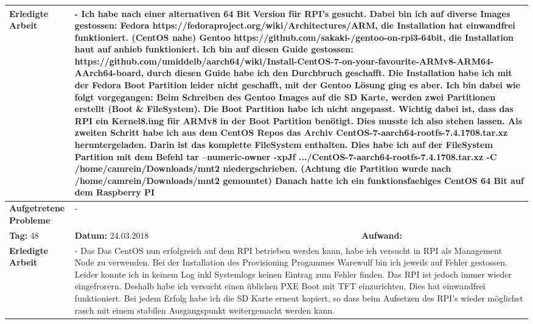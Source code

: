 \begin{longtable}{|p{5cm}|p{5cm}|p{6cm}|}
\textbf{Erledigte Arbeit} & \multicolumn{2}{p{11cm}|}{- Ich habe nach einer alternativen 64 Bit Version für RPI's gesucht. Dabei bin ich auf diverse Images gestossen: \newline Fedora https://fedoraproject.org/wiki/Architectures/ARM, die Installation hat einwandfrei funktioniert. (CentOS nahe) \newline Gentoo https://github.com/sakaki-/gentoo-on-rpi3-64bit, die Installation haut auf anhieb funktioniert. Ich bin auf diesen Guide gestossen: https://github.com/umiddelb/aarch64/wiki/Install-CentOS-7-on-your-favourite-ARMv8-ARM64-AArch64-board, durch diesen Guide habe ich den Durchbruch geschafft. Die Installation habe ich mit der Fedora Boot Partition leider nicht geschafft, mit der Gentoo Lösung ging es aber. Ich bin dabei wie folgt vorgegangen: Beim Schreiben des Gentoo Images auf die SD Karte, werden zwei Partitionen erstellt (Boot \& FileSystem). Die Boot Partition habe ich nicht angepasst. Wichtig dabei ist, dass das RPI ein Kernel8.img für ARMv8 in der Boot Partition benötigt. Dies musste ich also stehen lassen. Als zweiten Schritt habe ich aus dem CentOS Repos das Archiv CentOS-7-aarch64-rootfs-7.4.1708.tar.xz heruntergeladen. Darin ist das komplette FileSystem enthalten. Dies habe ich auf der FileSystem Partition mit dem Befehl tar --numeric-owner -xpJf .../CentOS-7-aarch64-rootfs-7.4.1708.tar.xz -C /home/camrein/Downloads/mnt2 niedergschrieben. (Achtung die Partition wurde nach /home/camrein/Downloads/mnt2 gemountet) Danach hatte ich ein funktionsfaehiges CentOS 64 Bit auf dem Raspberry PI} \\ \hline
\textbf{Aufgetretene Probleme} & \multicolumn{2}{p{11cm}|}{-} \\ \hline
\rowcolor{heading}\textbf{Tag:} 48 & \textbf{Datum:} 24.03.2018 & \textbf{Aufwand:} \\ \hline
\textbf{Erledigte Arbeit} & \multicolumn{2}{p{11cm}|}{- 	
Das Das CentOS nun erfolgreich auf dem RPI betrieben werden kann, habe ich versucht in RPI als Management Node zu verwenden. Bei der Installation des Provisioning Progammes Warewulf bin ich jeweils auf Fehler gestossen. Leider konnte ich in keinem Log inkl Systemlogs keinen Eintrag zum Fehler finden. Das RPI ist jedoch immer wieder eingefrorern. Deshalb habe ich versucht einen üblichen PXE Boot mit TFT einzurichten. Dies hat einwandfrei funktioniert. Bei jedem Erfolg habe ich die SD Karte erneut kopiert, so dass beim Aufsetzen des RPI's wieder möglichst rasch mit einem stabilen Ausgangspunkt weitergemacht werden kann.} \\ \hline

\end{longtable}
